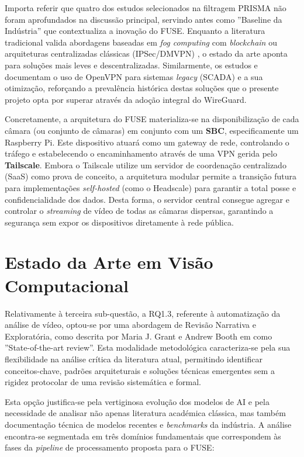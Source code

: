 Importa referir que quatro dos estudos selecionados na filtragem \gls{PRISMA} não foram aprofundados na discussão principal, servindo antes como ''Baseline da Indústria'' que contextualiza a inovação do FUSE. Enquanto a literatura tradicional valida abordagens baseadas em \textit{fog computing} com \textit{blockchain} \cite{trabelsi_fog_2024} ou arquiteturas centralizadas clássicas (IPSec/DMVPN) \cite{qaraqe_publicvision_2024}, o estado da arte aponta para soluções mais leves e descentralizadas. Similarmente, os estudos \cite{maceda_scada_2022} e \cite{hussain_securing_2019} documentam o uso de OpenVPN para sistemas \textit{legacy} (SCADA) e a sua otimização, reforçando a prevalência histórica destas soluções que o presente projeto opta por superar através da adoção integral do WireGuard.

Concretamente, a arquitetura do \gls{FUSE} materializa-se na disponibilização de cada câmara (ou conjunto de câmaras) em conjunto com um \textbf{\gls{SBC}}, especificamente um Raspberry Pi. Este dispositivo atuará como um gateway de rede, controlando o tráfego e estabelecendo o encaminhamento através de uma \gls{VPN} gerida pelo \textbf{Tailscale}. Embora o Tailscale utilize um servidor de coordenação centralizado (\gls{SaaS}) como prova de conceito, a arquitetura modular permite a transição futura para implementações \textit{self-hosted} (como o Headscale) para garantir a total posse e confidencialidade dos dados. Desta forma, o servidor central consegue agregar e controlar o \textit{streaming} de vídeo de todas as câmaras dispersas, garantindo a segurança sem expor os dispositivos diretamente à rede pública.


\section{Estado da Arte em Visão Computacional}
\label{sec:estado_arte_visao}

Relativamente à terceira sub-questão, a RQ1.3, referente à automatização da análise de vídeo, optou-se por uma abordagem de Revisão Narrativa e Exploratória, como descrita por Maria J. Grant e Andrew Booth em \cite{Grant2009} como ''State-of-the-art review''. Esta modalidade metodológica caracteriza-se pela sua flexibilidade na análise crítica da literatura atual, permitindo identificar conceitos-chave, padrões arquiteturais e soluções técnicas emergentes sem a rigidez protocolar de uma revisão sistemática e formal.

Esta opção justifica-se pela vertiginosa evolução dos modelos de \gls{AI} e pela necessidade de analisar não apenas literatura académica clássica, mas também documentação técnica de modelos recentes e \textit{benchmarks} da indústria. A análise encontra-se segmentada em três domínios fundamentais que correspondem às fases da \textit{pipeline} de processamento proposta para o \gls{FUSE}:

